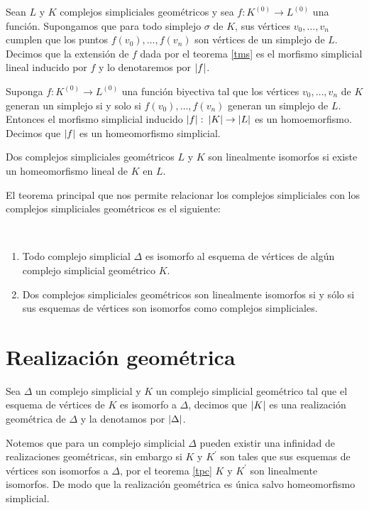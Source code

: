 \begin{Defi}
Sean $L$ y $K$ complejos simpliciales geométricos y sea $f\colon K^{(0)} \rightarrow L^{(0)}$ una función. Supongamos que  para todo simplejo $\sigma$ de $K$, sus vértices $v_0,\ldots,v_n$ cumplen que los puntos $f(v_0),\ldots,f(v_n)$ son vértices de un simplejo de $L$. Decimos que la extensión de $f$ dada por el teorema \ref{tms} es el morfismo simplicial lineal inducido por $f$ y lo denotaremos por $\left| f \right|$.
\end{Defi}
\begin{Teo}
Suponga $f:K^{(0)}\rightarrow L^{(0)}$ una función biyectiva tal que los vértices $v_0,\ldots,v_n$ de $K$ generan un simplejo si y solo si $f(v_0),\ldots,f(v_n)$ generan un simplejo de $L$. Entonces el morfismo simplicial inducido $\left| f \right|\colon \left| K \right|\rightarrow\left| L \right|$ es un homoemorfismo. Decimos que $\left| f \right|$ es un homeomorfismo simplicial.
\end{Teo}
\begin{Defi}
Dos complejos simpliciales geométricos $L$ y $K$ son linealmente isomorfos si existe un homeomorfismo lineal de $K$ en $L$.
\end{Defi}
El teorema principal que nos permite relacionar los complejos simpliciales con los complejos simpliciales geométricos es el siguiente:
\begin{Teo}\label{tpc} 
~\begin{enumerate}
\item Todo complejo simplicial $\Delta$ es isomorfo al esquema de vértices de algún complejo simplicial geométrico $K$.
\item Dos complejos simpliciales geométricos son linealmente isomorfos si y sólo si sus esquemas de vértices son isomorfos como complejos simpliciales.
\end{enumerate}
\end{Teo}

\section{Realización geométrica}
\begin{Defi}
Sea $\Delta$ un complejo simplicial y $K$ un complejo simplicial geométrico tal que el esquema de vértices de $K$ es isomorfo a $\Delta$, decimos que $\left| K \right|$ es una realización geométrica de $\Delta$ y la denotamos por $\left| \Delta \right|$.
\end{Defi}
Notemos que para un complejo simplicial $\Delta$ pueden existir una infinidad de realizaciones geométricas, sin embargo si $K$ y $K^{'}$ son tales que sus esquemas de vértices son isomorfos a $\Delta$, por el teorema \ref{tpc} $K$ y $K^{'}$ son linealmente isomorfos. De modo que la realización geométrica es única salvo homeomorfismo simplicial.

